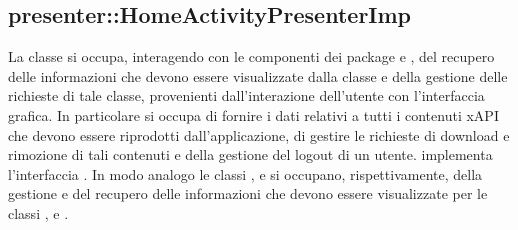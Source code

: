 \documentclass[../Tesi.tex]{subfiles}
\begin{document}
		\subsection{presenter::HomeActivityPresenterImp}
		La classe  si occupa, interagendo con le componenti dei package  e , del recupero delle informazioni che devono essere visualizzate dalla classe  e della gestione delle richieste di tale classe, provenienti dall'interazione dell'utente con l'interfaccia grafica. In particolare si occupa di fornire i dati relativi a tutti i contenuti xAPI che devono essere riprodotti dall'applicazione, di gestire le richieste di download e rimozione di tali contenuti e della gestione del logout di un utente.  implementa l'interfaccia . In modo analogo le classi ,  e  si occupano, rispettivamente, della gestione e del recupero delle informazioni che devono essere visualizzate per le classi ,  e .
\end{document}
